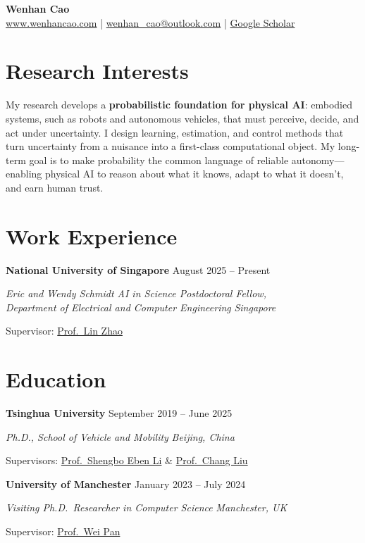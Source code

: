 \documentclass[11pt,a4paper]{article}
\newlength{\gapM}\setlength{\gapM}{4pt plus 2pt minus 1pt}  %
\newcommand{\entry}[4]{%
  \begin{samepage}%
  \textbf{#1} \hfill #2\par\nopagebreak
  {\itshape #3} \hfill {\itshape #4}\par\nopagebreak
  \end{samepage}}
\begin{document}
\begin{center}
  {\Huge\bfseries Wenhan Cao}\\[6pt]
  \href{https://www.wenhancao.com}{www.wenhancao.com} \;|\;
  \href{mailto:wenhan_cao@outlook.com}{wenhan\_cao@outlook.com} \;|\;
  \href{https://scholar.google.com/citations?user=43xAy7MAAAAJ&hl=en}{Google Scholar}
\end{center}

\section{Research Interests}
My research develops a \textbf{probabilistic foundation for physical AI}: embodied systems, such as robots and autonomous vehicles, that must perceive, decide, and act under uncertainty. I design learning, estimation, and control methods that turn uncertainty from a nuisance into a first-class computational object. My long-term goal is to make probability the common language of reliable autonomy---enabling physical AI to reason about what it knows, adapt to what it doesn't, and earn human trust.

\section{Work Experience}
\entry{National University of Singapore}{August 2025 -- Present}
      {Eric and Wendy Schmidt AI in Science Postdoctoral Fellow,\\ Department of Electrical and Computer Engineering}{Singapore}
Supervisor: \href{https://sites.google.com/view/lzhao}{Prof.\ Lin Zhao}

\section{Education}
\entry{Tsinghua University}{September 2019 -- June 2025}
      {Ph.D., School of Vehicle and Mobility}{Beijing, China}
Supervisors: \href{https://scholar.google.com/citations?user=Dxiw1K8AAAAJ&hl=en}{Prof.\ Shengbo Eben Li} \&
\href{http://www2.coe.pku.edu.cn/faculty/liuchang/}{Prof.\ Chang Liu}
\vspace{\gapM}

\entry{University of Manchester}{January 2023 -- July 2024}
      {Visiting Ph.D.\ Researcher in Computer Science}{Manchester, UK}
Supervisor: \href{https://panweihit.github.io/}{Prof.\ Wei Pan}
\vspace{\gapM}
\end{document}
